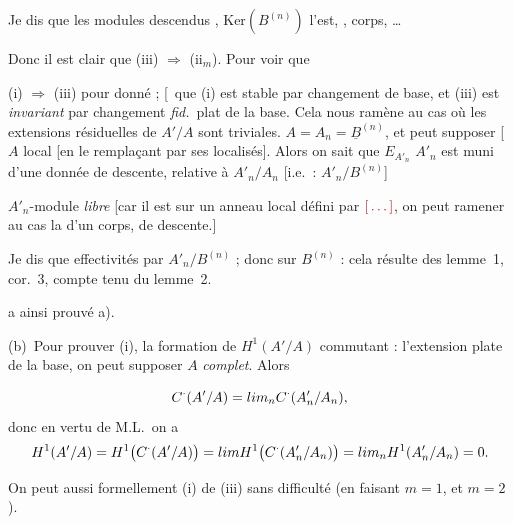 \documentclass[11pt,a4paper]{article}
\begin{document}
Je dis que les modules descendus \ill{} \ill{} \ill{} \ill{} \ill{},
\ill{} \ill{} $\mathrm{Ker}(B^{(n)})$ l'est, \ill{} \ill{} \ill{}
\ill{} \ill{} \ill{} \ill{} \ill{}, \ill{} corps, \ill{} \ill{}
\ill{} \ill{} \ill{} \ldots
\marginal{\ill{} : \ill{}}

Donc il est clair que (iii) $\Longrightarrow$ (ii$_m$). Pour voir que


 (i) $\Longrightarrow$ (iii) pour \ill{} \ill{} donné ;
[\,\ill{} \ill{} que (i) est stable par changement de base, et (iii) est
\emph{invariant} par changement  \emph{fid.}\ plat de la base.
Cela nous ramène au cas où les extensions résiduelles de $A'/A$ sont
triviales. 
$A = A_n = \underline{B}^{(n)}$, et
 peut supposer [$A$ local [en le remplaçant par ses
localisés]. Alors on sait que $E_{A'_n}$  $A'_n$ est muni
d'une donnée de descente, \struck{\ill{}} relative à $A'_n/A_n$ [i.e.\ :
$A'_n/B^{(n)}$]

\ill{} $A'_n$-module \emph{libre} [car il est \ill{} \ill{} \ill{}
\ill{} sur un anneau local \ill{} \ill{} \ill{} défini par \ill{} \ill{}
$\ill{}$, on peut \ill{} ramener au cas \ill{} la 
d'un corps, \ill{} \ill{} \ill{} \ill{} \ill{} \ill{} \ill{} de
descente.]

Je dis que  effectivités par $A'_n/B^{(n)}$ ; donc
 \ill{} \ill{} \ill{} \ill{} \ill{} sur $B^{(n)}$ :
cela résulte des lemme~1, cor.~3, compte tenu du lemme~2.

 a ainsi prouvé a).

(b)\ Pour prouver (i),  la formation de
$H^1(A'/A)$ commutant : l'extension plate de la base, on peut supposer $A$
\emph{complet}. Alors \struck{\ill{}}


\[
  C^{\cdot}(A'/A) = \varprojlim_n C^{\cdot}(A'_n/A_n) ,
\]
donc en vertu de M.L.\ on a
\[
  H^1(A'/A) = H^1\bigl(C^{\cdot}(A'/A)\bigr)
  = \varprojlim H^1\bigl(C^{\cdot}(A'_n/A_n)\bigr)
  = \varprojlim_n H^1(A'_n/A_n) = 0 .
\]

On peut aussi  formellement (i) de (iii) sans difficulté
(en faisant $m = 1$, et $m = 2$).
\end{document}
